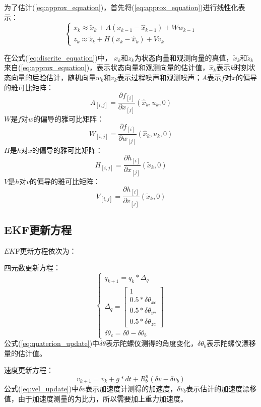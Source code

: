 \documentclass{article}
\begin{document}
为了估计(\ref{eq:approx_equation})，首先将(\ref{eq:approx_equation})进行线性化表示：
\begin{equation}
	\left\{
	\begin{array}{c}
	x_k \approx \tilde{x}_k + A(x_{k-1} - \hat{x}_{k-1}) + Ww_{k-1} \\
	z_k \approx \tilde{z}_k + H(x_k - \hat{x}_k) + Vv_k
	\end{array}
	\right.
	\label{eq:discrite_equation}
\end{equation}

在公式(\ref{eq:discrite_equation})中， $x_k$和$z_k$为状态向量和观测向量的真值，$\tilde{x}_k$和$\tilde{z}_k$来自(\ref{eq:approx_equation})，表示状态向量和观测向量的估计值，$\hat{x}_k$表示$k$时刻状态向量的后验估计，随机向量$w_k$和$v_k$表示过程噪声和观测噪声；$A$表示$f$对$x$的偏导的雅可比矩阵：
$$A_{[i,j]}=\frac{\partial f_{[i]}}{\partial x_{[j]}}(\hat{x}_k,u_k,0)$$
$W$是$f$对$w$的偏导的雅可比矩阵：
$$W_{[i,j]}=\frac{\partial f_{[i]}}{\partial w_{[j]}}(\hat{x}_k,u_k,0)$$
$H$是$h$对$x$的偏导的雅可比矩阵：
$$H_{[i,j]}=\frac{\partial h_{[i]}}{\partial x_{[j]}}(\tilde{x}_k,0)$$
$V$是$h$对$v$的偏导的雅可比矩阵：
$$V_{[i,j]}=\frac{\partial h_{[i]}}{\partial v_{[j]}}(\tilde{x}_k,0)$$
\subsection{EKF更新方程}
$EK$F更新方程依次为：

四元数更新方程：
\begin{equation}
\left\{
\begin{array}{c}
	q_{k+1} = q_k * \Delta_q \\
	\Delta_q = 
	\left[
	\begin{array}{c}
	1 \\
	0.5 *\delta \theta_{xc} \\
	0.5 *\delta \theta_{yc} \\
	0.5 *\delta \theta_{zc}
	\end{array}
	\right] \\
	\delta \theta_c = \delta \theta - \delta \theta_b 
	
\end{array}
\right.
\label{eq:quaterion_update}
\end{equation}
公式(\ref{eq:quaterion_update})中$\delta\theta$表示陀螺仪测得的角度变化，$\delta\theta_b$表示陀螺仪漂移量的估计值。

速度更新方程：
\begin{equation}
	v_{k+1} = v_k + g * dt + R_{b}^{n}(\delta v - \delta v_b)
	\label{eq:vel_update}
\end{equation}
公式(\ref{eq:vel_update})中$\delta v$表示加速度计测得的加速度，$\delta v_b$表示估计的加速度漂移值，由于加速度测量的为比力，所以需要加上重力加速度。
\end{document}
